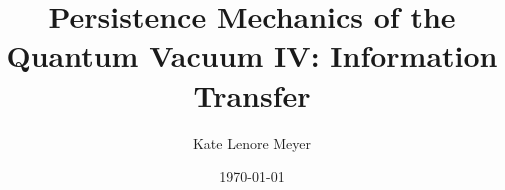 \documentclass[aps,prd,twocolumn,showpacs,superscriptaddress,groupedaddress,nofootinbib,english,floatfix]{revtex4-2}
\begin{document}
\title{Persistence Mechanics of the Quantum Vacuum IV: Information Transfer}

\author{Kate Lenore Meyer}

\date{\today}



\maketitle %








\clearpage










\end{document}
